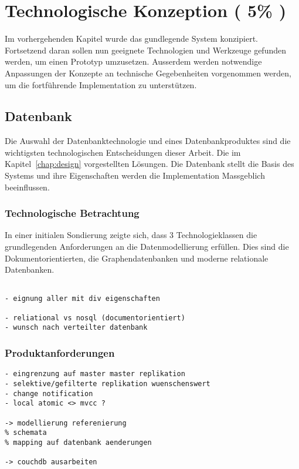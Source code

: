 \chapter{Technologische Konzeption ( 5\% )}


Im vorhergehenden Kapitel wurde das gundlegende System konzipiert.
Fortsetzend daran sollen nun geeignete Technologien und Werkzeuge gefunden werden,
um einen Prototyp umzusetzen.
Ausserdem werden notwendige Anpassungen der Konzepte an technische Gegebenheiten vorgenommen werden,
um die fortf\"uhrende Implementation zu unterst\"utzen.





\section{Datenbank}

Die Auswahl der Datenbanktechnologie und eines Datenbankproduktes sind die wichtigsten technologischen Entscheidungen dieser Arbeit.
Die im Kapitel~\ref{chap:design} vorgestellten L\"osungen.
Die Datenbank stellt die Basis des Systems und ihre Eigenschaften werden die Implementation Massgeblich beeinflussen.


\subsection{Technologische Betrachtung}

In einer initialen Sondierung zeigte sich,
dass 3 Technologieklassen die grundlegenden Anforderungen an die Datenmodellierung erf\"ullen.
Dies sind die Dokumentorientierten, die Graphendatenbanken und moderne relationale Datenbanken.




\begin{verbatim}

- eignung aller mit div eigenschaften

- reliational vs nosql (documentorientiert)
- wunsch nach verteilter datenbank
\end{verbatim}

\subsection{Produktanforderungen}

\begin{verbatim}
- eingrenzung auf master master replikation
- selektive/gefilterte replikation wuenschenswert
- change notification
- local atomic <> mvcc ?

-> modellierung referenierung
% schemata
% mapping auf datenbank aenderungen

-> couchdb ausarbeiten

\end{verbatim}


